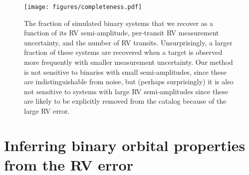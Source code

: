 \documentclass[modern, letterpaper]{aastex631}
\newcommand{\project}[1]{\textsl{#1}}
\newcommand{\Gaia}{\project{Gaia}}
\begin{document}

\begin{figure}
	\begin{centering}
		\texttt{[image: figures/completeness.pdf]}
		\caption{The fraction of simulated binary systems that we recover as a function of its RV semi-amplitude, per-transit RV measurement uncertainty, and the number of RV transits. Unsurprisingly, a larger fraction of these systems are recovered when a target is observed more frequently with smaller measurement uncertainty. Our method is not sensitive to binaries with small semi-amplitudes, since these are indistinguishable from noise, but (perhaps surprisingly) it is also not sensitive to systems with large RV semi-amplitudes since these are likely to be explicitly removed from the catalog because of the large RV error.}
		\label{fig:completeness}
	\end{centering}
\end{figure}


\newpage

\section{Inferring binary orbital properties from the RV error}
\end{document}
